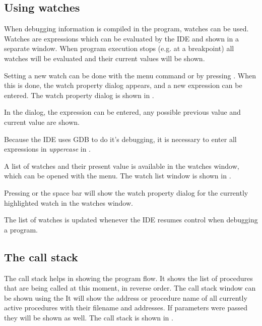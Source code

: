 %
%
\subsection{Using watches}
When debugging information is compiled in the program, watches can be used.
Watches are expressions which can be evaluated by the IDE and shown in a
separate window. When program execution stops (e.g. at a breakpoint) all
watches will be evaluated and their current values will be shown.

Setting a new watch can be done with the  menu
command or by pressing . When this is done, the watch
property dialog appears, and a new expression can be entered.
The watch property dialog is shown in .


In the dialog, the expression can be entered, any possible previous value
and current value are shown.
\begin{remark}
Because the IDE uses GDB to do it's debugging, it is necessary to enter all
expressions in {\em uppercase} in \freebsd.
\end{remark}
A list of watches and their present value is available in the watches
window, which can be opened with the  menu.
The watch list window is shown in .


Pressing  or the space bar will show the watch property dialog
for the currently highlighted watch in the watches window.

The list of watches is updated whenever the IDE resumes control when
debugging a program.
%
%
\subsection{The call stack}
\label{se:callstack}
The call stack helps in showing the program flow. It shows the list of
procedures that are being called at this moment, in reverse order.
The call stack window can be shown using the 
It will show the address or procedure name of all currently active
procedures with their filename and addresses. If parameters were passed
they will be shown as well. The call stack is shown in .


